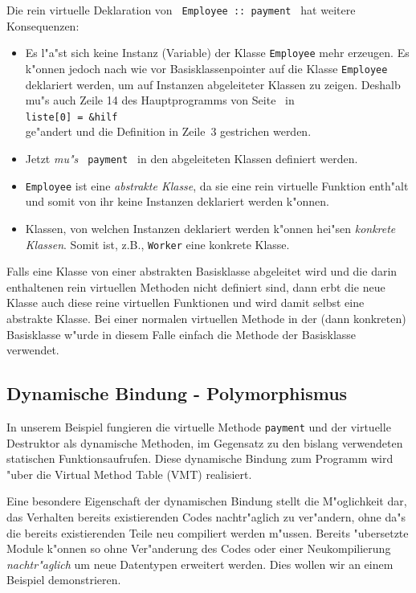 Die rein virtuelle Deklaration von \verb| Employee :: payment | hat weitere
Konsequenzen:
\begin{itemize}
 \item Es l"a"st sich keine Instanz (Variable) der Klasse \verb|Employee|
 	mehr erzeugen. Es k"onnen jedoch nach wie vor Basisklassenpointer
	auf die Klasse \verb|Employee| deklariert werden, um auf
	Instanzen abgeleiteter Klassen zu zeigen.
	Deshalb mu"s auch Zeile 14 des Hauptprogramms  von Seite~\pageref{lst:a4_pov}
	in
	\\
	\verb|liste[0] = &hilf|
	\\
	ge"andert und die Definition in Zeile~3 gestrichen
	werden.
 \item Jetzt \emph{mu"s} \verb| payment | in den abgeleiteten Klassen definiert werden.
 \item \verb|Employee| ist eine \emph{abstrakte Klasse}, da sie eine rein
 	virtuelle Funktion enth"alt und somit von ihr keine Instanzen deklariert werden
	k"onnen.
 \item Klassen, von welchen Instanzen deklariert werden k"onnen hei"sen
 	\emph{konkrete Klassen}.
	Somit ist, z.B., \verb|Worker| eine konkrete Klasse.
\end{itemize}
Falls eine Klasse von einer abstrakten Basisklasse abgeleitet wird und die
darin enthaltenen rein virtuellen Methoden nicht definiert sind, dann erbt die neue
Klasse auch diese reine virtuellen Funktionen und wird damit selbst eine
abstrakte Klasse. Bei einer normalen virtuellen Methode in der (dann konkreten)
Basisklasse w"urde in diesem Falle einfach die Methode der Basisklasse verwendet.
%
%
\subsection{Dynamische Bindung - Polymorphismus}
\label{sec:A2.3}
%
In unserem Beispiel fungieren die virtuelle Methode \verb|payment| und der
virtuelle Destruktor als dynamische Methoden, im Gegensatz zu den bislang
verwendeten statischen Funktionsaufrufen.
Diese dynamische Bindung zum Programm wird "uber die Virtual Method Table (VMT)
realisiert.

Eine besondere Eigenschaft der dynamischen Bindung stellt die M"oglichkeit dar,
das Verhalten bereits existierenden Codes nachtr"aglich zu ver"andern,
ohne da"s die bereits existierenden Teile neu compiliert werden m"ussen.
Bereits "ubersetzte Module k"onnen so ohne Ver"anderung des Codes oder einer
Neukompilierung \emph{nachtr"aglich} um neue Datentypen erweitert werden.
Dies wollen wir an einem Beispiel demonstrieren.


